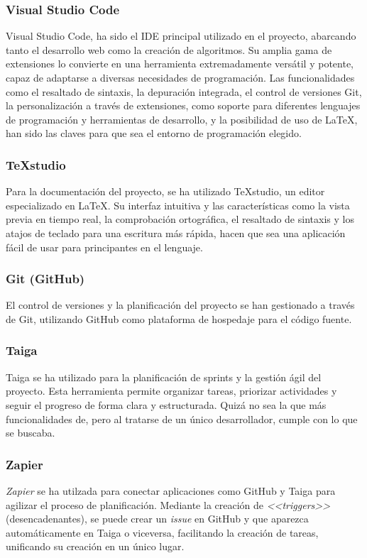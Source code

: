 \subsubsection{Visual Studio Code}
Visual Studio Code, ha sido el IDE principal utilizado en el proyecto, abarcando tanto el desarrollo web como la creación de algoritmos. Su amplia gama de extensiones lo convierte en una herramienta extremadamente versátil y potente, capaz de adaptarse a diversas necesidades de programación. Las funcionalidades como el resaltado de sintaxis, la depuración integrada, el control de versiones Git, la personalización a través de extensiones, como soporte para diferentes lenguajes de programación y herramientas de desarrollo, y la posibilidad de uso de \LaTeX, han sido las claves para que sea el entorno de programación elegido. 
\subsubsection{TeXstudio}
Para la documentación del proyecto, se ha utilizado TeXstudio, un editor especializado en \LaTeX. Su interfaz intuitiva y las características como la vista previa en tiempo real, la comprobación ortográfica, el resaltado de sintaxis y los atajos de teclado para una escritura más rápida, hacen que sea una aplicación fácil de usar para principantes en el lenguaje.

\subsubsection{Git (GitHub)}
El control de versiones y la planificación del proyecto se han gestionado a través de Git, utilizando GitHub como plataforma de hospedaje para el código fuente.

\subsubsection{Taiga}
Taiga se ha utilizado para la planificación de sprints y la gestión ágil del proyecto. Esta herramienta permite organizar tareas, priorizar actividades y seguir el progreso de forma clara y estructurada. Quizá no sea la que más funcionalidades de, pero al tratarse de un único desarrollador, cumple con lo que se buscaba.

\subsubsection{Zapier}
\textit{Zapier} se ha utilzada para conectar aplicaciones como GitHub y Taiga para agilizar el proceso de planificación. Mediante la creación de \textit{<<triggers>>} (desencadenantes), se puede crear un \textit{issue} en GitHub y que aparezca automáticamente en Taiga o viceversa, facilitando la creación de tareas, unificando su creación en un único lugar.

